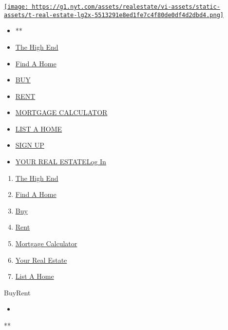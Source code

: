 \href{/section/realestate}{\texttt{[image: https://g1.nyt.com/assets/realestate/vi-assets/static-assets/t-real-estate-lg2x-5513291e8ed1fe7c4f80de0df4d2dbd4.png]}}

\begin{itemize}
\tightlist
\item
  **
\item
  \href{/real-estate/the-high-end}{The High End}
\item
  \href{/real-estate/find-a-home}{Find A Home}
\item
  \href{/real-estate/homes-for-sale}{BUY}
\item
  \href{/real-estate/homes-for-rent}{RENT}
\item
  \href{/real-estate/mortgage-calculator}{MORTGAGE CALCULATOR}
\item
  \href{https://nytimesads.gtspayments.com}{LIST A HOME}
\item
  \href{https://myaccount.nytimes.com/auth/register?client_id=real.estate.ui\&display=control\&redirect_uri=\%2Freal-estate\%2Fhomes-for-rent\%3F\&response_type=cookie}{SIGN
  UP}
\item
  \href{https://myaccount.nytimes.com/auth/login?client_id=real.estate.ui\&display=control\&redirect_uri=\%2Freal-estate\%2Fhomes-for-rent\%3F\&response_type=cookie}{YOUR
  REAL ESTATELog In}
\end{itemize}

\begin{enumerate}
\def\labelenumi{\arabic{enumi}.}
\tightlist
\item
  \href{/real-estate/the-high-end}{The High End}
\item
  \href{/real-estate/find-a-home}{Find A Home}
\item
  \href{/real-estate/homes-for-sale}{Buy}
\item
  \href{/real-estate/homes-for-rent}{Rent}
\item
  \href{/real-estate/mortgage-calculator}{Mortgage Calculator}
\item
  \href{/real-estate/my-real-estate}{Your Real Estate}
\item
  \href{https://nytimesads.gtspayments.com/}{List A Home}
\end{enumerate}

BuyRent

\begin{itemize}
\item
\end{itemize}

**

